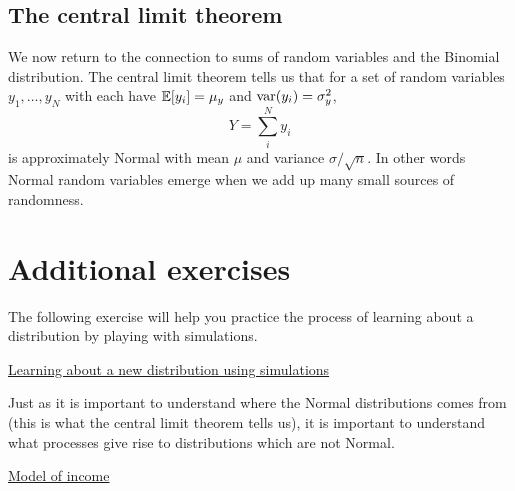 \subsection{The central limit theorem}
We now return to the connection to sums of random variables and the Binomial distribution. The {\dfn central limit theorem} tells us that for a set of random variables $y_1,\dots,y_N$ with each have $\mathbb E[y_i] = \mu_y$ and ${\rm var}(y_i) = \sigma_y^2$,
\begin{equation}
Y = \sum_i^N y_i
\end{equation}
is approximately Normal with mean $\mu$ and variance $\sigma/\sqrt{n}$.
In other words Normal random variables emerge when we add up many small sources of randomness.

\section{Additional exercises}

The following exercise will help you practice the process of learning about a distribution by playing with simulations. 
 
 \begin{exercise} 
 \href{https://colab.research.google.com/drive/1PPFwE4GUzsr707s3mPhGRs7-TYlHxND2#scrollTo=YzDOf8zsU5x0&line=1&uniqifier=1}{Learning about a new distribution using simulations}
\end{exercise}

Just as it is important to understand where the Normal distributions comes from (this is what the central limit theorem tells us), it is important to understand what processes give rise to distributions which are not Normal. 
 \begin{exercise} 
 \href{https://colab.research.google.com/drive/1PPFwE4GUzsr707s3mPhGRs7-TYlHxND2#scrollTo=YzDOf8zsU5x0&line=1&uniqifier=1}{Model of income}
\end{exercise}



